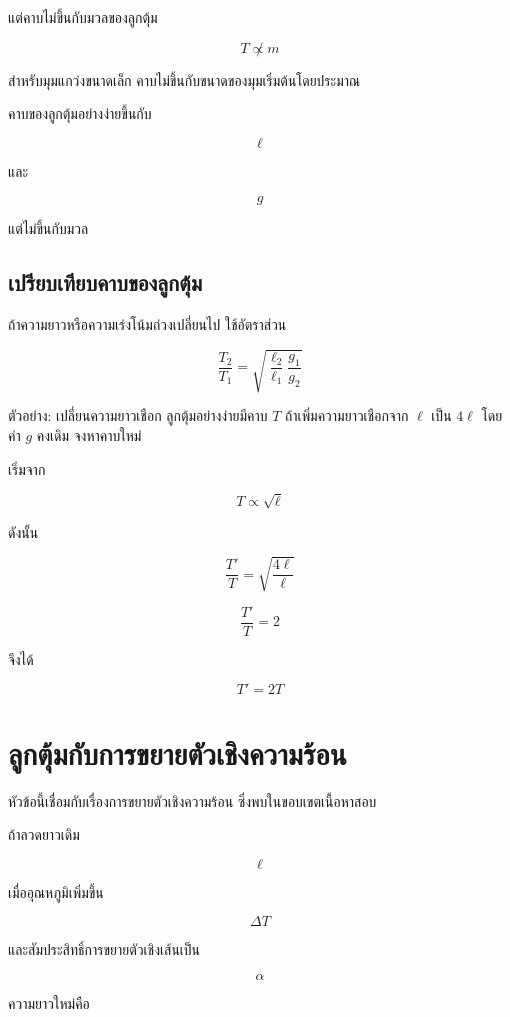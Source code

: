 แต่คาบไม่ขึ้นกับมวลของลูกตุ้ม

\[
T\not\propto m
\]

สำหรับมุมแกว่งขนาดเล็ก คาบไม่ขึ้นกับขนาดของมุมเริ่มต้นโดยประมาณ

\begin{tcolorbox}[title=ข้อควรจำ]
คาบของลูกตุ้มอย่างง่ายขึ้นกับ

\[
\ell
\]

และ

\[
g
\]

แต่ไม่ขึ้นกับมวล
\end{tcolorbox}

\subsection{เปรียบเทียบคาบของลูกตุ้ม}

ถ้าความยาวหรือความเร่งโน้มถ่วงเปลี่ยนไป ใช้อัตราส่วน

\[
\frac{T_2}{T_1}
=
\sqrt{
\frac{\ell_2}{\ell_1}
\frac{g_1}{g_2}
}
\]

\begin{examplebox}{ตัวอย่าง: เปลี่ยนความยาวเชือก}
ลูกตุ้มอย่างง่ายมีคาบ $T$ ถ้าเพิ่มความยาวเชือกจาก $\ell$ เป็น $4\ell$ โดยค่า $g$ คงเดิม จงหาคาบใหม่

เริ่มจาก

\[
T\propto\sqrt{\ell}
\]

ดังนั้น

\[
\frac{T'}{T}
=
\sqrt{\frac{4\ell}{\ell}}
\]

\[
\frac{T'}{T}=2
\]

จึงได้

\[
\boxed{T'=2T}
\]
\end{examplebox}

\section{ลูกตุ้มกับการขยายตัวเชิงความร้อน}

หัวข้อนี้เชื่อมกับเรื่องการขยายตัวเชิงความร้อน ซึ่งพบในขอบเขตเนื้อหาสอบ

ถ้าลวดยาวเดิม

\[
\ell
\]

เมื่ออุณหภูมิเพิ่มขึ้น

\[
\Delta T
\]

และสัมประสิทธิ์การขยายตัวเชิงเส้นเป็น

\[
\alpha
\]

ความยาวใหม่คือ


